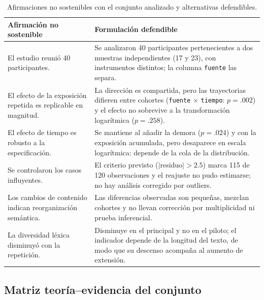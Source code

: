 \documentclass[12pt]{article}
\begin{document}
\begin{table}[htbp]
	\centering
	\caption{Afirmaciones no sostenibles con el conjunto analizado y alternativas defendibles.}
	\label{tab:no_sostener_combinado}
	\small
	\begin{tabular}{p{} p{}}
		\toprule
		\textbf{Afirmación no sostenible} & \textbf{Formulación defendible} \\
		\midrule
		El estudio reunió 40 participantes. &
		Se analizaron 40 participantes pertenecientes a dos muestras independientes (17 y 23),
		con instrumentos distintos; la columna \texttt{fuente} las separa. \\[2pt]
		El efecto de la exposición repetida es replicable en magnitud. &
		La dirección es compartida, pero las trayectorias difieren entre cohortes
		(\texttt{fuente} $\times$ \texttt{tiempo}: $p = .002$) y el efecto no sobrevive a la
		transformación logarítmica ($p = .258$). \\[2pt]
		El efecto de tiempo es robusto a la especificación. &
		Se mantiene al añadir la demora ($p = .024$) y con la exposición acumulada, pero
		desaparece en escala logarítmica: depende de la cola de la distribución. \\[2pt]
		Se controlaron los casos influyentes. &
		El criterio previsto ($|$residuo$| > 2.5$) marca 115 de 120 observaciones y el reajuste
		no pudo estimarse; no hay análisis corregido por outliers. \\[2pt]
		Los cambios de contenido indican reorganización semántica. &
		Las diferencias observadas son pequeñas, mezclan cohortes y no llevan corrección por
		multiplicidad ni prueba inferencial. \\[2pt]
		La diversidad léxica disminuyó con la repetición. &
		Disminuye en el principal y no en el piloto; el indicador depende de la longitud del
		texto, de modo que su descenso acompaña al aumento de extensión. \\
		\bottomrule
	\end{tabular}
\end{table}

\subsection{Matriz teoría--evidencia del conjunto}
\end{document}
